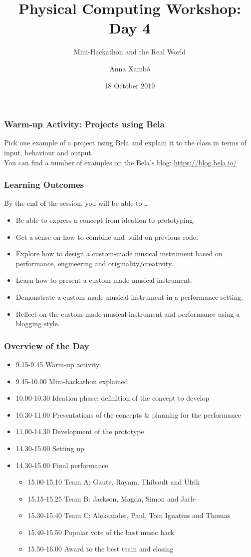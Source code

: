 \documentclass[screen, aspectratio=169]{beamer}
\title[PCW-d1]{Physical Computing Workshop: Day 4}
\subtitle{Mini-Hackathon and the Real World}
\author[A. Xamb{\'o}]{Anna Xamb{\'o}}
\institute[NTNU]{Department of Music, NTNU}
\date{18 October 2019}
\begin{document}
\begin{frame}
  \titlepage
\end{frame}
%
\usebackgroundtemplate{}
\begin{frame}
\frametitle{Warm-up Activity: Projects using Bela}
Pick one example of a project using Bela and explain it to the class in terms of input, behaviour and output. \\
You can find a number of examples on the Bela's blog: \url{https://blog.bela.io/}
\end{frame}
%
\begin{frame}
  \frametitle{Learning Outcomes}
  By the end of the session, you will be able to \dots
  \begin{itemize}
    \item Be able to express a concept from ideation to prototyping.
    \item Get a sense on how to combine and build on previous code.
    \item Explore how to design a custom-made musical instrument based on performance, engineering and originality/creativity.  
    \item Learn how to present a custom-made musical instrument.
    \item Demonstrate a custom-made musical instrument in a performance setting.
    \item Reflect on the custom-made musical instrument and performance using a blogging style.
  \end{itemize}
\end{frame}
%
\begin{frame}
  \frametitle{Overview of the Day}
      \begin{itemize}
	\item 9.15-9.45 Warm-up activity
	\item 9.45-10.00 Mini-hackathon explained
	\item 10.00-10.30 Ideation phase: definition of the concept to develop
	\item 10.30-11.00 Presentations of the concepts \& planning for the performance
	\item 11.00-14.30 Development of the prototype
	\item 14.30-15.00 Setting up
	\item 14.30-15.00 Final performance
	\begin{itemize}
	\item 15.00-15.10 Team A: Gaute, Rayam, Thibault and Ulrik
	\item 15.15-15.25 Team B: Jackson, Magda, Simon and Jarle 
	\item 15.30-15.40 Team C: Aleksander, Paul, Tom Ignatius and Thomas
	\item 15.40-15.50 Popular vote of the best music hack
	\item 15.50-16.00 Award to the best team and closing
	\end{itemize}
    \end{itemize}  
\end{frame}
\end{document}
